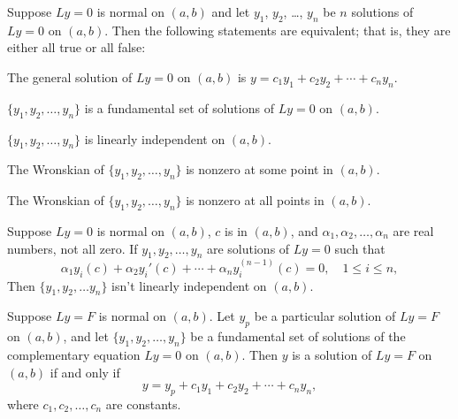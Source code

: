 \setcounter{theorem}{3}
\begin{theorem}
  \label{thmtype:9.1.4} Suppose $Ly=0$ is normal on $(a,b)$ and let $y_{1}$, $y_{2}$, \dots, $y_{n}$
  be $n$ solutions of $Ly=0$ on $(a,b)$. Then the following statements are equivalent; that is, they
  are either all true or all false:
  \begin{alist}
    \item %
    The general solution of $Ly=0$ on $(a,b)$ is $y=c_{1}y_{1}+c_{2}y_{2}+\cdots+c_{n}y_{n}$.

    \item %
    $\{y_{1},y_{2},\dots,y_{n}\}$ is a fundamental set of solutions of $Ly=0$ on $(a,b)$.

    \item %
    $\{y_{1},y_{2},\dots,y_{n}\}$ is linearly independent on $(a,b)$.

    \item %
    The Wronskian of $\{y_{1},y_{2},\dots,y_{n}\}$ is nonzero at some point in $(a,b)$.

    \item %
    The Wronskian of $\{y_{1},y_{2},\dots,y_{n}\}$ is nonzero at all points in $(a,b)$.
  \end{alist}
\end{theorem}

\setcounter{theorem}{4}
\setcounter{equation}{15}
\begin{theorem}
  \label{thmtype:9.1.5} Suppose $Ly=0$ is normal on $(a,b)$, $c$ is in $(a,b)$, and $\alpha_{1},\alpha_{2},\dots,\alpha_{n}$ are real
  numbers, not all zero. If $y_{1},y_{2},\dots,y_{n}$ are solutions of $Ly=0$ such that
  \begin{equation}
    \label{eq:9.1.16}\alpha_{1}y_{i}(c)+\alpha_{2}y_{i}'(c)+\cdots+\alpha_{n}y_{i}^{(n-1)}(c)=0,\quad1\le i\le n,
  \end{equation}
  Then $\{y_{1},y_{2},\dots y_{n}\}$ isn't linearly independent on $(a,b)$.
\end{theorem}

\setcounter{theorem}{5}
\begin{theorem}
  \label{thmtype:9.1.6} Suppose $Ly=F$ is normal on $(a,b)$. Let $y_{p}$ be a particular solution of
  $Ly=F$ on $(a,b)$, and let $\{y_{1},y_{2},\dots,y_{n}\}$ be a fundamental set of solutions of the
  complementary equation $Ly=0$ on $(a,b)$. Then $y$ is a solution of $Ly=F$ on $(a,b)$ if and only
  if
  \[
    y=y_{p}+c_{1}y_{1}+c_{2}y_{2}+\cdots+c_{n}y_{n},
  \]
  where $c_{1},c_{2},\dots,c_{n}$ are constants.
\end{theorem}

